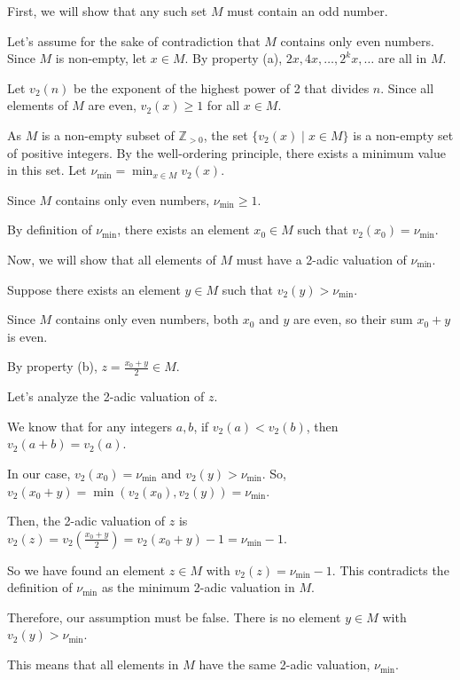 \documentclass[12pt,a4paper]{article}
\theoremstyle{definition}
\begin{document}
        First, we will show that any such set $M$ must contain an odd number.

        Let's assume for the sake of contradiction that $M$ contains only even numbers. Since $M$ is non-empty, let $x \in M$. By property (a), $2x, 4x, \ldots, 2^k x, \ldots$ are all in $M$.

        Let $v_2(n)$ be the exponent of the highest power of 2 that divides $n$. Since all elements of $M$ are even, $v_2(x) \geq 1$ for all $x \in M$.

        As $M$ is a non-empty subset of $\mathbb{Z}_{>0}$, the set $\{v_2(x) \mid x \in M\}$ is a non-empty set of positive integers. By the well-ordering principle, there exists a minimum value in this set. Let $\nu_{\min} = \min_{x \in M} v_2(x)$.

        Since $M$ contains only even numbers, $\nu_{\min} \geq 1$.

        By definition of $\nu_{\min}$, there exists an element $x_0 \in M$ such that $v_2(x_0) = \nu_{\min}$.

        Now, we will show that all elements of $M$ must have a 2-adic valuation of $\nu_{\min}$.

        Suppose there exists an element $y \in M$ such that $v_2(y) > \nu_{\min}$.

        Since $M$ contains only even numbers, both $x_0$ and $y$ are even, so their sum $x_0+y$ is even.

        By property (b), $z = \frac{x_0+y}{2} \in M$.

        Let's analyze the 2-adic valuation of $z$.

        We know that for any integers $a, b$, if $v_2(a) < v_2(b)$, then $v_2(a+b) = v_2(a)$.

        In our case, $v_2(x_0) = \nu_{\min}$ and $v_2(y) > \nu_{\min}$. So, $v_2(x_0+y) = \min(v_2(x_0), v_2(y)) = \nu_{\min}$.

        Then, the 2-adic valuation of $z$ is $v_2(z) = v_2\left(\frac{x_0+y}{2}\right) = v_2(x_0+y) - 1 = \nu_{\min}-1$.

        So we have found an element $z \in M$ with $v_2(z) = \nu_{\min}-1$. This contradicts the definition of $\nu_{\min}$ as the minimum 2-adic valuation in $M$.

        Therefore, our assumption must be false. There is no element $y \in M$ with $v_2(y) > \nu_{\min}$.

        This means that all elements in $M$ have the same 2-adic valuation, $\nu_{\min}$.
\end{document}
